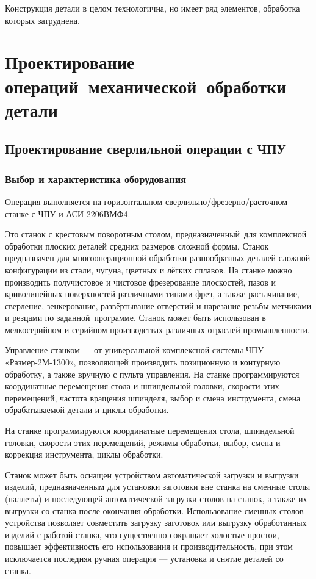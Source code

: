 \documentclass[14pt,russian,a4paper]{extreport}
\begin{document}
Конструкция детали в целом технологична, но имеет ряд элементов, обработка которых затруднена.


\chapter{Проектирование операций механической обработки детали}

\section{Проектирование сверлильной операции с ЧПУ}

\subsection{Выбор и характеристика оборудования}
Операция выполняется на горизонтальном сверлильно\-/фрезерно\-/расточном станке с ЧПУ и АСИ 2206ВМФ4. 

Это станок с крестовым поворотным столом, предназначенный для комплексной обработки плоских деталей средних размеров сложной формы. Станок предназначен для многооперационной обработки разнообразных деталей сложной конфигурации из стали, чугуна, цветных и лёгких сплавов. На станке можно производить получистовое и чистовое фрезерование плоскостей, пазов и криволинейных поверхностей различными типами фрез, а также растачивание, сверление, зенкерование, развёртывание отверстий и нарезание резьбы метчиками и резцами по заданной программе. Станок может быть использован в мелкосерийном и серийном производствах различных отраслей промышленности.

Управление станком --- от универсальной комплексной системы ЧПУ «Размер-2М-1300», позволяющей производить позиционную и контурную обработку, а также вручную с пульта управления. На станке программируются координатные перемещения стола и шпиндельной головки, скорости этих перемещений, частота вращения шпинделя, выбор и смена инструмента, смена обрабатываемой детали и циклы обработки.

На станке программируются координатные перемещения стола, шпиндельной головки, скорости этих перемещений, режимы обработки, выбор, смена и коррекция инструмента, циклы обработки.

Станок может быть оснащен устройством автоматической загрузки и выгрузки изделий, предназначенным для установки заготовки вне станка на сменные столы (паллеты) и последующей автоматической загрузки столов на станок, а также их выгрузки со станка после окончания обработки. Использование сменных столов устройства позволяет совместить загрузку заготовок или выгрузку обработанных изделий с работой станка, что существенно сокращает холостые простои, повышает эффективность его использования и производительность, при этом исключается последняя ручная операция --- установка и снятие деталей со станка.
\end{document}
